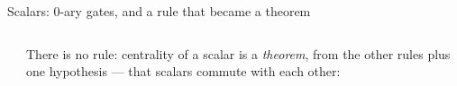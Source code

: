 \begin{frame}{Scalars: 0-ary gates, and a rule that became a theorem \New}
\begin{columns}[c]
\begin{column}{0.55\textwidth}
\begin{code}
\AgdaSymbol{(}\AgdaSpace{}%
\AgdaSymbol{:}\AgdaSpace{}%
\AgdaSpace{}%
\AgdaSymbol{)}\AgdaSpace{}%
\AgdaSpace{}%
\AgdaSymbol{(}\AgdaSpace{}%
\AgdaSymbol{)}\AgdaSpace{}%
\AgdaSpace{}%
\AgdaOperator{\AgdaInductiveConstructor{[}}\AgdaSpace{}%
\AgdaSpace{}%
\AgdaSpace{}%
\AgdaOperator{\AgdaInductiveConstructor{]ʷ}}\AgdaSpace{}%
\AgdaSpace{}%
\AgdaOperator{\AgdaDatatype{===}}\AgdaSpace{}%
\AgdaOperator{\AgdaInductiveConstructor{[}}\AgdaSpace{}%
\AgdaSpace{}%
\AgdaSpace{}%
\AgdaOperator{\AgdaInductiveConstructor{]ʷ}}\<%
\end{code}
\end{column}
\begin{column}{0.42\textwidth}
\renewcommand{\AgdaCodeStyle}{\scriptsize}
\small There is \alert{no}  rule: centrality of a scalar is a
\emph{theorem}, from the other rules plus one hypothesis --- that scalars
commute with each other:
\begin{code}%
\>[0]\AgdaSpace{}%
\<%
\\
\>[0][@{}l@{\AgdaIndent{0}}]%
\>[2]\AgdaSymbol{(}\AgdaSpace{}%
\AgdaSymbol{:}\AgdaSpace{}%
\AgdaSpace{}%
\AgdaSymbol{\{}\AgdaSymbol{\}}\AgdaSpace{}%
\AgdaSymbol{(}\AgdaSpace{}%
\AgdaSpace{}%
\AgdaSymbol{:}\AgdaSpace{}%
\AgdaSpace{}%
\AgdaSymbol{)}\AgdaSpace{}%
\<%
\\
\>[2][@{}l@{\AgdaIndent{0}}]%
\>[5]\AgdaOperator{\AgdaInductiveConstructor{[}}%
\>[286I]\AgdaSpace{}%
\AgdaSymbol{\{}\AgdaSymbol{\}}\AgdaSpace{}%
\AgdaSpace{}%
\AgdaOperator{\AgdaInductiveConstructor{]ʷ}}\AgdaSpace{}%
\AgdaSpace{}%
\AgdaOperator{\AgdaInductiveConstructor{[}}\AgdaSpace{}%
\AgdaSpace{}%
\AgdaSpace{}%
\AgdaOperator{\AgdaInductiveConstructor{]ʷ}}\<%
\\
\>[.][@{}l@{}]\<[286I]%
\>[7]\AgdaSpace{}%
\AgdaOperator{\AgdaInductiveConstructor{[}}\AgdaSpace{}%
\AgdaSpace{}%
\AgdaSpace{}%
\AgdaOperator{\AgdaInductiveConstructor{]ʷ}}\AgdaSpace{}%
\AgdaSpace{}%

\end{code}
\end{column}
\end{columns}
\end{frame}
